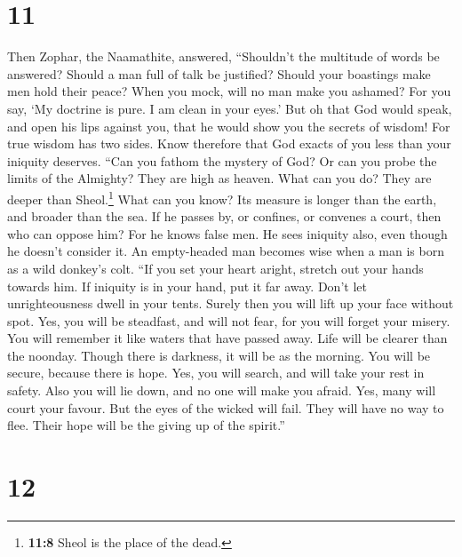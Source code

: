 \hypertarget{section-9}{%
\section{11}\label{section-9}}

 Then Zophar, the Naamathite, answered, 
``Shouldn't the multitude of words be answered? Should a man full of
talk be justified?  Should your boastings make men hold
their peace? When you mock, will no man make you ashamed? 
For you say, `My doctrine is pure. I am clean in your eyes.'
 But oh that God would speak, and open his lips against
you,  that he would show you the secrets of wisdom! For
true wisdom has two sides. Know therefore that God exacts of you less
than your iniquity deserves.  ``Can you fathom the mystery
of God? Or can you probe the limits of the Almighty?  They
are high as heaven. What can you do? They are deeper than
Sheol.\footnote{\textbf{11:8} Sheol is the place of the dead.} What can
you know?  Its measure is longer than the earth, and
broader than the sea.  If he passes by, or confines, or
convenes a court, then who can oppose him?  For he knows
false men. He sees iniquity also, even though he doesn't consider it.
 An empty-headed man becomes wise when a man is born as a
wild donkey's colt.  ``If you set your heart aright,
stretch out your hands towards him.  If iniquity is in
your hand, put it far away. Don't let unrighteousness dwell in your
tents.  Surely then you will lift up your face without
spot. Yes, you will be steadfast, and will not fear,  for
you will forget your misery. You will remember it like waters that have
passed away.  Life will be clearer than the noonday.
Though there is darkness, it will be as the morning.  You
will be secure, because there is hope. Yes, you will search, and will
take your rest in safety.  Also you will lie down, and no
one will make you afraid. Yes, many will court your favour.
 But the eyes of the wicked will fail. They will have no
way to flee. Their hope will be the giving up of the spirit.''

\hypertarget{section-10}{%
\section{12}\label{section-10}}

